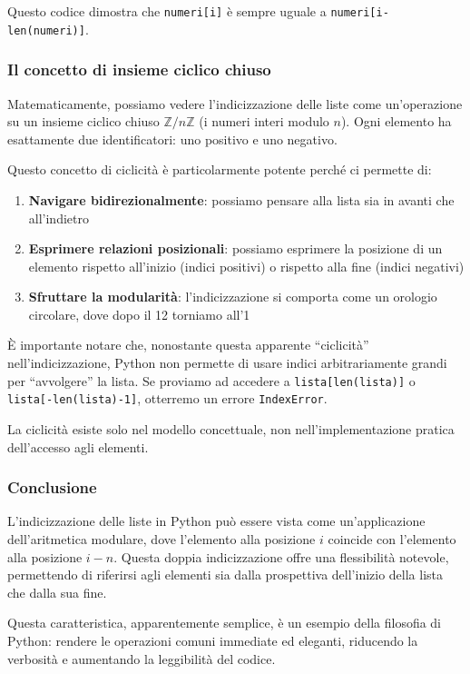 Questo codice dimostra che \texttt{numeri[i]} è sempre uguale a \texttt{numeri[i-len(numeri)]}.

\subsubsection{Il concetto di insieme ciclico chiuso}

Matematicamente, possiamo vedere l'indicizzazione delle liste come un'operazione su un insieme ciclico chiuso $\mathbb{Z}/n\mathbb{Z}$ (i numeri interi modulo $n$). Ogni elemento ha esattamente due identificatori: uno positivo e uno negativo.

Questo concetto di ciclicità è particolarmente potente perché ci permette di:
\begin{enumerate}
    \item \textbf{Navigare bidirezionalmente}: possiamo pensare alla lista sia in avanti che all'indietro
    \item \textbf{Esprimere relazioni posizionali}: possiamo esprimere la posizione di un elemento rispetto all'inizio (indici positivi) o rispetto alla fine (indici negativi)
    \item \textbf{Sfruttare la modularità}: l'indicizzazione si comporta come un orologio circolare, dove dopo il 12 torniamo all'1
\end{enumerate}

\begin{nota}
È importante notare che, nonostante questa apparente ``ciclicità'' nell'indicizzazione, Python non permette di usare indici arbitrariamente grandi per ``avvolgere'' la lista. Se proviamo ad accedere a \texttt{lista[len(lista)]} o \texttt{lista[-len(lista)-1]}, otterremo un errore \texttt{IndexError}.

La ciclicità esiste solo nel modello concettuale, non nell'implementazione pratica dell'accesso agli elementi.
\end{nota}

\subsubsection{Conclusione}

L'indicizzazione delle liste in Python può essere vista come un'applicazione dell'aritmetica modulare, dove l'elemento alla posizione $i$ coincide con l'elemento alla posizione $i-n$. Questa doppia indicizzazione offre una flessibilità notevole, permettendo di riferirsi agli elementi sia dalla prospettiva dell'inizio della lista che dalla sua fine.

Questa caratteristica, apparentemente semplice, è un esempio della filosofia di Python: rendere le operazioni comuni immediate ed eleganti, riducendo la verbosità e aumentando la leggibilità del codice.



